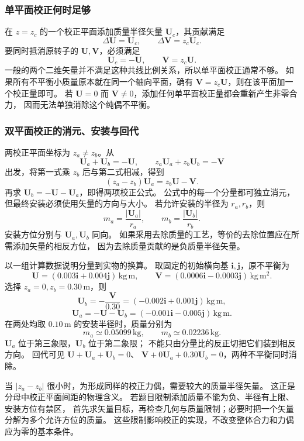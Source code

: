 \documentclass[UTF8,zihao=-4,fontset=fandol,a4paper]{ctexart}
\newcommand{\vect}[1]{\bm{#1}}
\begin{document}
\subsubsection*{单平面校正何时足够}
在 $z=z_c$ 的一个校正平面添加质量半径矢量 $\vect U_c$，其贡献满足
\[
\Delta\vect U=\vect U_c,\qquad
\Delta\vect V=z_c\vect U_c.
\]
要同时抵消原转子的 $\vect U,\vect V$，必须满足
\[
\vect U_c=-\vect U,\qquad \vect V=z_c\vect U.
\]
一般的两个二维矢量并不满足这种共线比例关系，所以单平面校正通常不够。
如果所有不平衡小质量原本就在同一个轴向平面，确有
$\vect V=z_c\vect U$，则在该平面加一个校正量即可。
若 $\vect U=0$ 而 $\vect V\ne0$，添加任何单平面校正量都会重新产生非零合力，
因而无法单独消除这个纯偶不平衡。

\subsubsection*{双平面校正的消元、安装与回代}
两校正平面坐标为 $z_a\ne z_b$。从
\[
\vect U_a+\vect U_b=-\vect U,\qquad
z_a\vect U_a+z_b\vect U_b=-\vect V
\]
出发，将第一式乘 $z_b$ 后与第二式相减，得到
\[
(z_a-z_b)\vect U_a=z_b\vect U-\vect V.
\]
再求 $\vect U_b=-\vect U-\vect U_a$，即得两项校正公式。
公式中的每一个分量都可独立消元，但最终安装必须使用矢量的方向与大小。
若允许安装的半径为 $r_a,r_b$，则
\[
m_a=\frac{|\vect U_a|}{r_a},\qquad
m_b=\frac{|\vect U_b|}{r_b}.
\]
安装方位分别与 $\vect U_a,\vect U_b$ 同向。
如果采用去除质量的工艺，等价的去除位置应在所需添加矢量的相反方位，
因为去除质量贡献的是负质量半径矢量。

以一组计算数据说明分量到实物的换算。
取固定的初始横向基 $\vect i,\vect j$，原不平衡为
\[
\vect U=(0.003\vect i+0.004\vect j)\,\mathrm{kg\,m},\qquad
\vect V=(0.0006\vect i-0.0003\vect j)\,\mathrm{kg\,m^2}.
\]
选择 $z_a=0,z_b=0.30\,\mathrm m$，则
\[
\vect U_b=-\frac{\vect V}{0.30}
=(-0.002\vect i+0.001\vect j)\,\mathrm{kg\,m},
\]
\[
\vect U_a=-\vect U-\vect U_b
=(-0.001\vect i-0.005\vect j)\,\mathrm{kg\,m}.
\]
在两处均取 $0.10\,\mathrm m$ 的安装半径时，质量分别为
\[
m_a\simeq0.05099\,\mathrm{kg},\qquad
m_b\simeq0.02236\,\mathrm{kg}.
\]
$\vect U_a$ 位于第三象限，$\vect U_b$ 位于第二象限；
不能只由分量比的反正切把它们装到相反方向。
回代可见 $\vect U+\vect U_a+\vect U_b=0$、
$\vect V+0\vect U_a+0.30\vect U_b=0$，两种不平衡同时消除。

当 $|z_a-z_b|$ 很小时，为形成同样的校正力偶，需要较大的质量半径矢量。
这正是分母中校正平面间距的物理含义。
若题目限制添加质量不能为负、半径有上限、安装方位有禁区，
首先求矢量目标，再检查几何与质量限制；必要时把一个矢量分解为多个允许方位的质量。
这些限制影响校正的实现，不改变整体合力和力偶应为零的基本条件。
\end{document}
